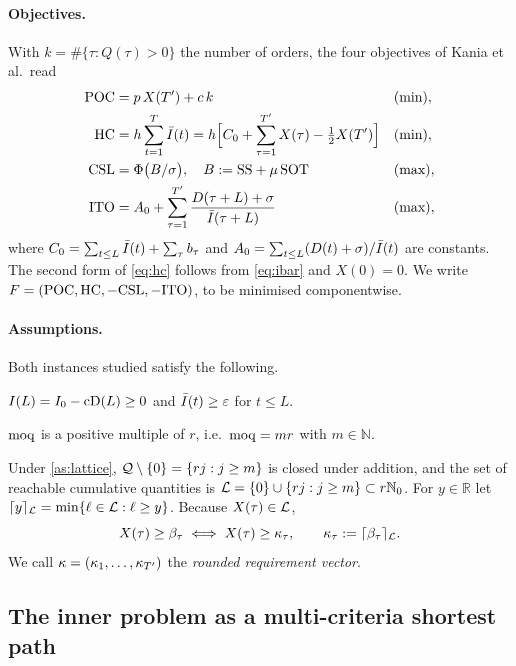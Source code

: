 \paragraph{Objectives.}
With $k=\#\{\tau : Q(\tau)>0\}$ the number of orders, the four objectives of
Kania et al.\ read
\begin{align}
  \mathrm{POC} &= p\,X(T')+c\,k &&\text{(min)},\label{eq:poc}\\
  \mathrm{HC}  &= h\sum_{t=1}^{T}\bar I(t)
        = h\Bigl[C_0+\sum_{\tau=1}^{T'}X(\tau)-\tfrac12X(T')\Bigr]
        &&\text{(min)},\label{eq:hc}\\
  \mathrm{CSL} &= \Phi\bigl(B/\sigma\bigr),\quad B:=\mathrm{SS}+\mu\,\mathrm{SOT} &&\text{(max)},\label{eq:csl}\\
  \mathrm{ITO} &= A_0+\sum_{\tau=1}^{T'}\frac{D(\tau+L)+\sigma}{\bar I(\tau+L)} &&\text{(max)},\label{eq:ito}
\end{align}
where $C_0=\sum_{t\le L}\bar I(t)+\sum_{\tau}b_\tau$ and
$A_0=\sum_{t\le L}(D(t)+\sigma)/\bar I(t)$ are constants. The second form of
\eqref{eq:hc} follows from \eqref{eq:ibar} and $X(0)=0$. We write
$F=(\mathrm{POC},\mathrm{HC},-\mathrm{CSL},-\mathrm{ITO})$, to be minimised componentwise.

\paragraph{Assumptions.} Both instances studied satisfy the following.
\begin{assumption}\label{as:initial}
  $I(L)=I_0-\mathrm{cD}(L)\ge 0$ and $\bar I(t)\ge\varepsilon$ for $t\le L$.
\end{assumption}
\begin{assumption}\label{as:lattice}
  $\mathrm{moq}$ is a positive multiple of $r$, i.e.\ $\mathrm{moq}=m r$ with $m\in\mathbb{N}$.
\end{assumption}
Under \cref{as:lattice}, $\mathcal{Q}\setminus\{0\}=\{r j : j\ge m\}$ is closed under addition,
and the set of reachable cumulative quantities is
$\mathcal{L}=\{0\}\cup\{r j : j\ge m\}\subset r\mathbb{N}_0$. For $y\in\mathbb{R}$ let
$\lceil y\rceil_{\mathcal{L}}=\min\{\ell\in\mathcal{L} : \ell\ge y\}$. Because $X(\tau)\in\mathcal{L}$,
\begin{equation}\label{eq:kappa}
  X(\tau)\ge\beta_\tau \iff X(\tau)\ge\kappa_\tau,\qquad
  \kappa_\tau:=\lceil \beta_\tau\rceil_{\mathcal{L}}.
\end{equation}
We call $\kappa=(\kappa_1,\dots,\kappa_{T'})$ the \emph{rounded requirement vector}.

\subsection{The inner problem as a multi-criteria shortest path}\label{app:inner}

